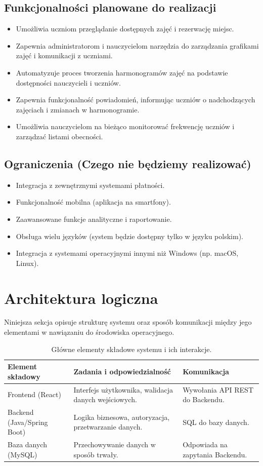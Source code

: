 \documentclass[12pt,a4paper]{article}
\begin{document}
\subsection{Funkcjonalności planowane do realizacji}
\begin{itemize}
    \item Umożliwia uczniom przeglądanie dostępnych zajęć i rezerwację miejsc.
    \item Zapewnia administratorom i nauczycielom narzędzia do zarządzania grafikami zajęć i komunikacji z uczniami.
    \item Automatyzuje proces tworzenia harmonogramów zajęć na podstawie dostępności nauczycieli i uczniów.
    \item Zapewnia funkcjonalność powiadomień, informując uczniów o nadchodzących zajęciach i zmianach w harmonogramie.
    \item Umożliwia nauczycielom na bieżąco monitorować frekwencję uczniów i zarządzać listami obecności.
\end{itemize}

\subsection{Ograniczenia (Czego nie będziemy realizować)}
\begin{itemize}
    \item Integracja z zewnętrznymi systemami płatności.
    \item Funkcjonalność mobilna (aplikacja na smartfony).
    \item Zaawansowane funkcje analityczne i raportowanie.
    \item Obsługa wielu języków (system będzie dostępny tylko w języku polskim).
    \item Integracja z systemami operacyjnymi innymi niż Windows (np. macOS, Linux).
\end{itemize}

\section{Architektura logiczna}
Niniejsza sekcja opisuje strukturę systemu oraz sposób komunikacji między jego elementami w nawiązaniu do środowiska operacyjnego.
\newpage
\begin{table}[h]
    \centering
    \renewcommand{\arraystretch}{1.5}
    \begin{tabularx}{\textwidth}{|l|X|X|}
    \hline
    \textbf{Element składowy} & \textbf{Zadania i odpowiedzialność} & \textbf{Komunikacja} \\ \hline
    Frontend (React) & Interfejs użytkownika, walidacja danych wejściowych. & Wywołania API REST do Backendu. \\ \hline
    Backend (Java/Spring Boot) & Logika biznesowa, autoryzacja, przetwarzanie danych. & SQL do bazy danych. \\ \hline
    Baza danych (MySQL) & Przechowywanie danych w sposób trwały. & Odpowiada na zapytania Backendu. \\ \hline
    \end{tabularx}
    \caption{Główne elementy składowe systemu i ich interakcje.}
\end{table}
\end{document}
